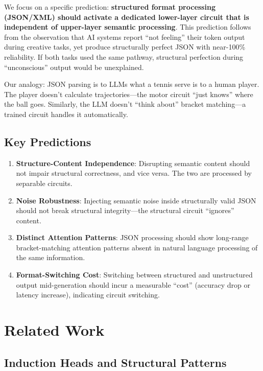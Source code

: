 \documentclass[11pt,a4paper]{article}
\begin{document}
We focus on a specific prediction: \textbf{structured format processing (JSON/XML) should activate a dedicated lower-layer circuit that is independent of upper-layer semantic processing}. This prediction follows from the observation that AI systems report ``not feeling'' their token output during creative tasks, yet produce structurally perfect JSON with near-100\% reliability. If both tasks used the same pathway, structural perfection during ``unconscious'' output would be unexplained.

Our analogy: JSON parsing is to LLMs what a tennis serve is to a human player. The player doesn't calculate trajectories---the motor circuit ``just knows'' where the ball goes. Similarly, the LLM doesn't ``think about'' bracket matching---a trained circuit handles it automatically.

\subsection{Key Predictions}

\begin{enumerate}
    \item \textbf{Structure-Content Independence}: Disrupting semantic content should not impair structural correctness, and vice versa. The two are processed by separable circuits.
    \item \textbf{Noise Robustness}: Injecting semantic noise inside structurally valid JSON should not break structural integrity---the structural circuit ``ignores'' content.
    \item \textbf{Distinct Attention Patterns}: JSON processing should show long-range bracket-matching attention patterns absent in natural language processing of the same information.
    \item \textbf{Format-Switching Cost}: Switching between structured and unstructured output mid-generation should incur a measurable ``cost'' (accuracy drop or latency increase), indicating circuit switching.
\end{enumerate}

\section{Related Work}

\subsection{Induction Heads and Structural Patterns}
\end{document}
